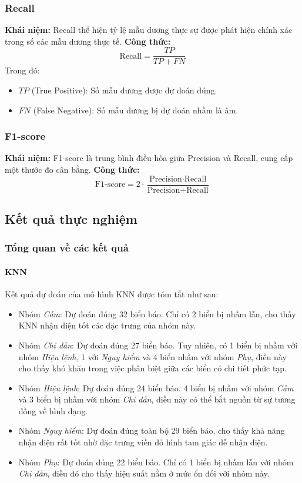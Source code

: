\documentclass[a4paper,12pt]{article}
\begin{document}
\subsubsection{Recall}
\textbf{Khái niệm:} Recall thể hiện tỷ lệ mẫu dương thực sự được phát hiện chính xác trong số các mẫu dương thực tế.  
\textbf{Công thức:}  
\[
\text{Recall} = \frac{TP}{TP + FN}
\]
Trong đó:
\begin{itemize}
    \item \(TP\) (True Positive): Số mẫu dương được dự đoán đúng.
    \item \(FN\) (False Negative): Số mẫu dương bị dự đoán nhầm là âm.
\end{itemize}

\subsubsection{F1-score}
\textbf{Khái niệm:} F1-score là trung bình điều hòa giữa Precision và Recall, cung cấp một thước đo cân bằng.  
\textbf{Công thức:}  
\[
\text{F1-score} = 2 \cdot \frac{\text{Precision} \cdot \text{Recall}}{\text{Precision} + \text{Recall}}
\]

\newpage
\subsection{Kết quả thực nghiệm}

\subsubsection{Tổng quan về các kết quả}

\paragraph{KNN} 
Kết quả dự đoán của mô hình KNN được tóm tắt như sau:
\begin{itemize}
    \item Nhóm \textit{Cấm}: Dự đoán đúng 32 biển báo. Chỉ có 2 biển bị nhầm lẫn, cho thấy KNN nhận diện tốt các đặc trưng của nhóm này.
    \item Nhóm \textit{Chỉ dẫn}: Dự đoán đúng 27 biển báo. Tuy nhiên, có 1 biển bị nhầm với nhóm \textit{Hiệu lệnh}, 1 với \textit{Nguy hiểm} và 4 biển nhầm với nhóm \textit{Phụ}, điều này cho thấy khó khăn trong việc phân biệt giữa các biển có chi tiết phức tạp.
    \item Nhóm \textit{Hiệu lệnh}: Dự đoán đúng 24 biển báo. 4 biển bị nhầm với nhóm \textit{Cấm} và 3 biển bị nhầm với nhóm \textit{Chỉ dẫn}, điều này có thể bắt nguồn từ sự tương đồng về hình dạng.
    \item Nhóm \textit{Nguy hiểm}: Dự đoán đúng toàn bộ 29 biển báo, cho thấy khả năng nhận diện rất tốt nhờ đặc trưng viền đỏ hình tam giác dễ nhận diện.
    \item Nhóm \textit{Phụ}: Dự đoán đúng 22 biển báo. Chỉ có 1 biển bị nhầm lẫn với nhóm \textit{Chỉ dẫn}, điều đó cho thấy hiệu suất nằm ở mức ổn đối với nhóm này.
\end{itemize}
\end{document}
